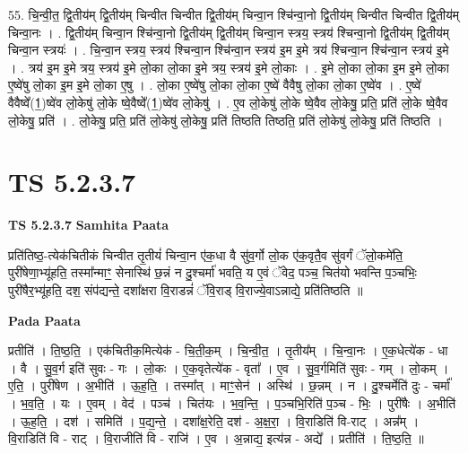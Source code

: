\documentclass[17pt]{extarticle}
\begin{document}
55. चि॒न्वी॒त॒ द्वि॒तीय॑म् द्वि॒तीय॑म् चिन्वीत चिन्वीत द्वि॒तीय॑म् चिन्वा॒न श्चि॑न्वा॒नो द्वि॒तीय॑म् चिन्वीत चिन्वीत द्वि॒तीय॑म् चिन्वा॒नः । . द्वि॒तीय॑म् चिन्वा॒न श्चि॑न्वा॒नो द्वि॒तीय॑म् द्वि॒तीय॑म् चिन्वा॒न स्त्रय॒ स्त्रय॑ श्चिन्वा॒नो द्वि॒तीय॑म् द्वि॒तीय॑म् चिन्वा॒न स्त्रयः॑ । . चि॒न्वा॒न स्त्रय॒ स्त्रय॑ श्चिन्वा॒न श्चि॑न्वा॒न स्त्रय॑ इ॒म इ॒मे त्रय॑ श्चिन्वा॒न श्चि॑न्वा॒न स्त्रय॑ इ॒मे । . त्रय॑ इ॒म इ॒मे त्रय॒ स्त्रय॑ इ॒मे लो॒का लो॒का इ॒मे त्रय॒ स्त्रय॑ इ॒मे लो॒काः । . इ॒मे लो॒का लो॒का इ॒म इ॒मे लो॒का ए॒ष्वे॑षु लो॒का इ॒म इ॒मे लो॒का ए॒षु । . लो॒का ए॒ष्वे॑षु लो॒का लो॒का ए॒ष्वे॑ वैवैषु लो॒का लो॒का ए॒ष्वे॑व । . ए॒ष्वे॑ वैवैष्वे᳚(1॒)ष्वे॑व लो॒केषु॑ लो॒के ष्वे॒वैष्वे᳚(1॒)ष्वे॑व लो॒केषु॑ । . ए॒व लो॒केषु॑ लो॒के ष्वे॒वैव लो॒केषु॒ प्रति॒ प्रति॑ लो॒के ष्वे॒वैव लो॒केषु॒ प्रति॑ । . लो॒केषु॒ प्रति॒ प्रति॑ लो॒केषु॑ लो॒केषु॒ प्रति॑ तिष्ठति तिष्ठति॒ प्रति॑ लो॒केषु॑ लो॒केषु॒ प्रति॑ तिष्ठति । \newline
\pagebreak
{}

\section{ TS 5.2.3.7 }

\textbf{TS 5.2.3.7 } \newline
\textbf{Samhita Paata} \newline

प्रति॑तिष्ठ॒-त्येक॑चितीकं चिन्वीत तृ॒तीयं॑ चिन्वा॒न ए॑क॒धा वै सु॑व॒र्गो लो॒क ए॑क॒वृतै॒व सु॑वर्गं ॅलो॒कमे॑ति॒ पुरी॑षेणा॒भ्यू॑हति॒ तस्मा᳚न्माꣳ॒॒ सेनास्थि॑ छ॒न्नं न दु॒श्चर्मा॑ भवति॒ य ए॒वं ॅवेद॒ पञ्च॒ चित॑यो भवन्ति प॒ञ्चभिः॒ पुरी॑षैर॒भ्यू॑हति॒ दश॒ संप॑द्यन्ते॒ दशा᳚क्षरा वि॒राडन्नं॑ ॅवि॒राड् वि॒राज्ये॒वाऽन्नाद्ये॒ प्रति॑तिष्ठति ॥ \newline

\textbf{Pada Paata} \newline

प्रतीति॑ । ति॒ष्ठ॒ति॒ । एक॑चितीक॒मित्येक॑ - चि॒ती॒क॒म् । चि॒न्वी॒त॒ । तृ॒तीय᳚म् । चि॒न्वा॒नः । ए॒क॒धेत्ये॑क - धा । वै । सु॒व॒र्ग इति॑ सुवः - गः । लो॒कः । ए॒क॒वृतेत्ये॑क - वृता᳚ । ए॒व । सु॒व॒र्गमिति॑ सुवः - गम् । लो॒कम् । ए॒ति॒ । पुरी॑षेण । अ॒भीति॑ । ऊ॒ह॒ति॒ । तस्मा᳚त् । माꣳ॒॒सेन॑ । अस्थि॑ । छ॒न्नम् । न । दु॒श्चर्मेति॑ दुः - चर्मा᳚ । भ॒व॒ति॒ । यः । ए॒वम् । वेद॑ । पञ्च॑ । चित॑यः । भ॒व॒न्ति॒ । प॒ञ्चभि॒रिति॑ प॒ञ्च - भिः॒ । पुरी॑षैः । अ॒भीति॑ । ऊ॒ह॒ति॒ । दश॑ । समिति॑ । प॒द्य॒न्ते॒ । दशा᳚क्ष॒रेति॒ दश॑ - अ॒क्ष॒रा॒ । वि॒राडिति॑ वि-राट् । अन्न᳚म् । वि॒राडिति॑ वि - राट् । वि॒राजीति॑ वि - राजि॑ । ए॒व । अ॒न्नाद्य॒ इत्य॑न्न - अद्ये᳚ । प्रतीति॑ । ति॒ष्ठ॒ति॒ ॥  \newline
\end{document}
